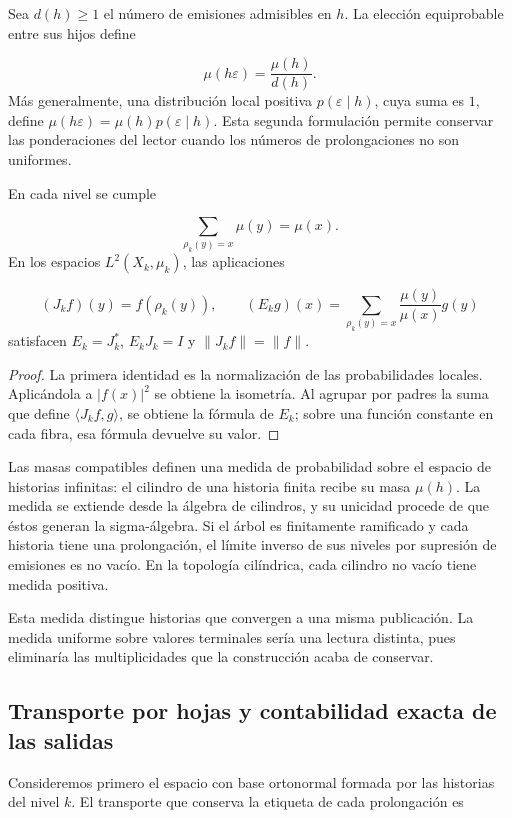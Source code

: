 Sea \(d(h)\geq1\) el número de emisiones admisibles en \(h\). La elección equiprobable entre sus hijos define

\[
\mu(h\varepsilon)=\frac{\mu(h)}{d(h)}.
\]
Más generalmente, una distribución local positiva \(p(\varepsilon\mid h)\), cuya suma es \(1\), define \(\mu(h\varepsilon)=\mu(h)p(\varepsilon\mid h)\). Esta segunda formulación permite conservar las ponderaciones del lector cuando los números de prolongaciones no son uniformes.

\begin{proposition}
\label{x_reciprocidad:iv:cont:esperanza}
En cada nivel se cumple

\[
\sum_{\rho_k(y)=x}\mu(y)=\mu(x).
\]
En los espacios \(L^2(X_k,\mu_k)\), las aplicaciones

\[
(J_kf)(y)=f(\rho_k(y)),
\qquad
(E_kg)(x)=\sum_{\rho_k(y)=x}\frac{\mu(y)}{\mu(x)}g(y)
\]
satisfacen \(E_k=J_k^*\), \(E_kJ_k=I\) y \(\|J_kf\|=\|f\|\).

\end{proposition}
\begin{proof}
La primera identidad es la normalización de las probabilidades locales. Aplicándola a \(|f(x)|^2\) se obtiene la isometría. Al agrupar por padres la suma que define \(\langle J_kf,g\rangle\), se obtiene la fórmula de \(E_k\); sobre una función constante en cada fibra, esa fórmula devuelve su valor.
\end{proof}

Las masas compatibles definen una medida de probabilidad sobre el espacio de historias infinitas: el cilindro de una historia finita recibe su masa \(\mu(h)\). La medida se extiende desde la álgebra de cilindros, y su unicidad procede de que éstos generan la sigma-álgebra. Si el árbol es finitamente ramificado y cada historia tiene una prolongación, el límite inverso de sus niveles por supresión de emisiones es no vacío. En la topología cilíndrica, cada cilindro no vacío tiene medida positiva.

Esta medida distingue historias que convergen a una misma publicación. La medida uniforme sobre valores terminales sería una lectura distinta, pues eliminaría las multiplicidades que la construcción acaba de conservar.

\subsection{Transporte por hojas y contabilidad exacta de las salidas}
\label{x_reciprocidad:iv:cont:transporte}
Consideremos primero el espacio con base ortonormal formada por las historias del nivel \(k\). El transporte que conserva la etiqueta de cada prolongación es

